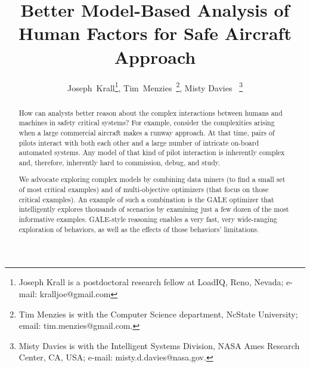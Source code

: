 \documentclass[journal]{IEEEtran}
\begin{document}
\title{Better Model-Based Analysis of\\ Human Factors for Safe Aircraft Approach}


\author{Joseph~Krall\thanks{Joseph Krall  
is a postdoctoral research fellow at LoadIQ, Reno, Nevada;
e-mail: kralljoe@gmail.com}, %
Tim~Menzies~\thanks{Tim Menzies is with the Computer Science department, NcState University; email:  tim.menzies@gmail.com.}, %
Misty Davies~
\thanks{
Misty Davies is with the Intelligent Systems Division,
NASA Ames Research Center, CA, USA;
e-mail:
misty.d.davies@nasa.gov.}
}

\maketitle
\begin{abstract}


How can analysts better reason about the complex interactions between humans and machines in safety critical systems? 
For example, consider the complexities arising when
a large commercial aircraft makes a runway approach.
At that time, pairs of pilots interact with both each other and a
large number of intricate on-board automated systems.  
Any model of that kind of pilot interaction is inherently complex and, therefore, inherently hard to commission, debug, and study.

We advocate exploring complex models by combining data miners (to find a small set of most critical examples) and of multi-objective optimizers (that focus on  those critical examples). 
An example of such a combination is the GALE optimizer that intelligently explores thousands of scenarios by examining just a few dozen of the most informative examples.  
GALE-style reasoning enables a very fast, very wide-ranging exploration of behaviors, as well as the effects of those behaviors' limitations.




\end{abstract}
\end{document}
